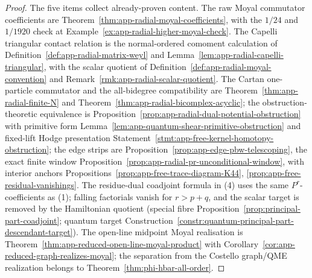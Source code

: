\begin{proof}
  The five items collect already-proven content.  The raw Moyal
  commutator coefficients are
  Theorem~\ref{thm:app-radial-moyal-coefficients}, with the
  \(1/24\) and \(1/1920\) check at
  Example~\ref{ex:app-radial-higher-moyal-check}.  The Capelli
  triangular contact relation is the normal-ordered comoment
  calculation of
  Definition~\ref{def:app-radial-matrix-weyl} and
  Lemma~\ref{lem:app-radial-capelli-triangular}, with the scalar
  quotient of Definition~\ref{def:app-radial-moyal-convention} and
  Remark~\ref{rmk:app-radial-scalar-quotient}.  The Cartan
  one-particle commutator and the all-bidegree compatibility are
  Theorem~\ref{thm:app-radial-finite-N} and
  Theorem~\ref{thm:app-radial-bicomplex-acyclic}; the obstruction-
  theoretic equivalence is
  Proposition~\ref{prop:app-radial-dual-potential-obstruction} with
  primitive form
  Lemma~\ref{lem:app-quantum-shear-primitive-obstruction} and
  fixed-lift Hodge presentation
  Statement~\ref{stmt:app-free-kernel-homotopy-obstruction}; the
  edge strips are
  Proposition~\ref{prop:app-edge-pbw-telescoping}, the exact finite
  window
  Proposition~\ref{prop:app-radial-pr-unconditional-window}, with
  interior anchors
  Propositions~\ref{prop:app-free-trace-diagram-K44},
  \ref{prop:app-free-residual-vanishings}.  The residue-dual coadjoint
  formula in (4) uses the same \(P^r\)-coefficients as (1); falling
  factorials vanish for \(r>p+q\), and the scalar target is removed by
  the Hamiltonian quotient (special fibre
  Proposition~\ref{prop:principal-part-coadjoint}; quantum target
  Construction~\ref{constr:quantum-principal-part-descendant-target}).
  The open-line midpoint Moyal realisation is
  Theorem~\ref{thm:app-reduced-open-line-moyal-product} with
  Corollary~\ref{cor:app-reduced-graph-realizes-moyal}; the separation
  from the Costello graph/QME realization belongs to
  Theorem~\ref{thm:phi-hbar-all-order}.
\end{proof}

